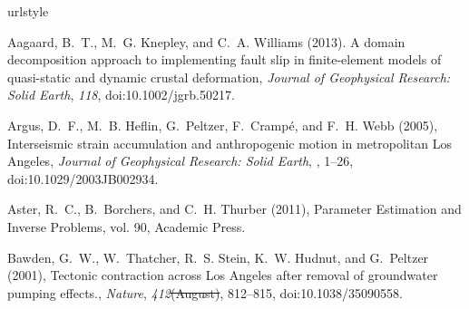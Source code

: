 \documentclass[draft,linenumbers]{AGUJournal}
\providecommand{\DIFadd}[1]{{\protect\color{blue}\uwave{#1}}} %
\providecommand{\DIFdel}[1]{{\protect\color{red}\sout{#1}}}                      %
\providecommand{\DIFaddbegin}{} %
\providecommand{\DIFaddend}{} %
\providecommand{\DIFdelbegin}{} %
\providecommand{\DIFdelend}{} %
\begin{document}
\DIFdelbegin %

\DIFdelend %
%
\begin{thebibliography}{52}
\providecommand{\natexlab}[1]{#1}
\expandafter\ifx\csname urlstyle\endcsname\relax
  \providecommand{\doi}[1]{doi:\discretionary{}{}{}#1}\else
  \providecommand{\doi}{doi:\discretionary{}{}{}\begingroup
  \urlstyle{rm}\Url}\fi

Aagaard, B.~T., M.~G. Knepley, and C.~A. Williams (2013). {A domain decomposition approach to implementing
fault slip in finite-element models of quasi-static and dynamic crustal deformation}, \textit{Journal of Geophysical
Research: Solid Earth}, \textit{118}, \doi{10.1002/jgrb.50217}.  

Argus, D.~F., M.~B. Heflin, G.~Peltzer, F.~Cramp{\'{e}}, and F.~H. Webb (2005), {Interseismic strain accumulation and anthropogenic motion in metropolitan Los Angeles}, \textit{Journal of Geophysical Research: Solid Earth}, \DIFdelbegin %
\DIFdelend \DIFaddbegin \textit{\DIFadd{110}}\DIFadd{(B04401)}\DIFaddend , 1--26, \doi{10.1029/2003JB002934}.

Aster, R.~C., B.~Borchers, and C.~H. Thurber (2011), {Parameter Estimation and Inverse Problems}, vol. 90, Academic Press.

Bawden, G.~W., W.~Thatcher, R.~S. Stein, K.~W. Hudnut, and G.~Peltzer (2001), {Tectonic contraction across Los Angeles after removal of groundwater pumping effects.}, \textit{Nature}, \textit{412}\DIFdelbegin \DIFdel{(August)}\DIFdelend , 812--815, \doi{10.1038/35090558}.


\end{thebibliography}
\end{document}

